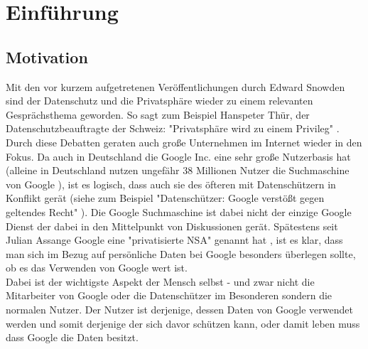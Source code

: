 %
% 

\chapter{Einführung}


\section{Motivation}
Mit den vor kurzem aufgetretenen Veröffentlichungen durch Edward Snowden sind der Datenschutz und die Privatsphäre wieder zu einem relevanten Gesprächsthema geworden. So sagt zum Beispiel Hanspeter Thür, der Datenschutzbeauftragte der Schweiz: "Privatsphäre wird zu einem Privileg" \cite{nzzdatenschutzprivileg}. Durch diese Debatten geraten auch große Unternehmen im Internet wieder in den Fokus. Da auch in Deutschland die Google Inc. eine sehr große Nutzerbasis hat (alleine in Deutschland nutzen ungefähr 38 Millionen Nutzer die Suchmaschine von Google \cite{statistagoogle}), ist es logisch, dass auch sie des öfteren mit Datenschützern in Konflikt gerät (siehe zum Beispiel "Datenschützer: Google verstößt gegen geltendes Recht" \cite{gulligooglegeltendesrecht}). Die Google Suchmaschine ist dabei nicht der einzige Google Dienst der dabei in den Mittelpunkt von Diskussionen gerät. Spätestens seit Julian Assange Google eine "privatisierte NSA" genannt hat \cite{assangegooglensa}, ist es klar, dass man sich im Bezug auf persönliche Daten bei Google besonders überlegen sollte, ob es das Verwenden von Google wert ist.\\
Dabei ist der wichtigste Aspekt der Mensch selbst - und zwar nicht die Mitarbeiter von Google oder die Datenschützer im Besonderen sondern die normalen Nutzer. Der Nutzer ist derjenige, dessen Daten von Google verwendet werden und somit derjenige der sich davor schützen kann, oder damit leben muss dass Google die Daten besitzt.


